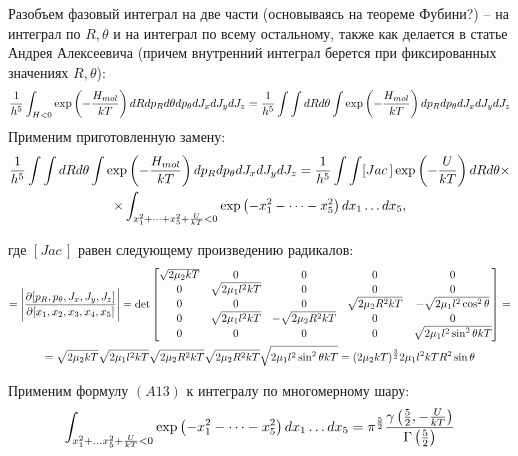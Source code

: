 \documentclass[14pt]{article}
\newcommand{\lb}{\left(}
\newcommand{\rb}{\right)}
\begin{document}
Разобъем фазовый интеграл на две части (основываясь на теореме Фубини?) -- на интеграл по $R, \theta$ и на интеграл по всему остальному, также как делается в статье Андрея Алексеевича (причем внутренний интеграл берется при фиксированных значениях $R, \theta$):
\begin{gather}
	\frac{1}{h^5} \int_{H < 0} \exp \lb -\frac{H_{mol}}{kT} \rb dR dp_R d\theta dp_\theta dJ_x dJ_y dJ_z = \frac{1}{h^5} \int \int dR d\theta \int \exp \lb -\frac{H_{mol}}{kT} \rb dp_R dp_\theta dJ_x dJ_y dJ_z \notag	
\end{gather}
Применим приготовленную замену:
\begin{gather}
	\frac{1}{h^5} \int \int dR d\theta \int \exp \lb -\frac{H_{mol}}{kT} \rb dp_R dp_\theta dJ_x dJ_y dJ_z = \frac{1}{h^5} \int \int [Jac \, ] \exp \lb -\frac{U}{kT} \rb dR d\theta \times \notag \\ \times \int_{x_1^2 + \dots + x_5^2 + \frac{U}{kT} < 0} \exp \lb - x_1^2 - \dots - x_5^2 \rb dx_1 \dots dx_5, \notag 
\end{gather}

где $[Jac \,]$ равен следующему произведению радикалов: 
\begin{gather}
	[Jac\,] = \Bigg{|} \frac{\partial [p_R, p_\theta, J_x, J_y, J_z]}{\partial [x_1, x_2, x_3, x_4, x_5]} \Bigg{|} = \det  
	\begin{bmatrix}
		\sqrt{2 \mu_2 k T} & 0 & 0 & 0 & 0 \\
		0 & \sqrt{2 \mu_1 l^2 k T} & 0 & 0 & 0 \\
		0 & 0 & 0 & \sqrt{2 \mu_2 R^2 k T} & -\sqrt{2 \mu_1 l^2 \cos^2 \theta} \\
		0 & \sqrt{2 \mu_1 l^2 k T} & -\sqrt{2 \mu_2 R^2 k T} & 0 & 0 \\
		0 & 0 & 0 & 0 & \sqrt{2 \mu_1 l^2 \sin^2 \theta k T}
	\end{bmatrix} = \notag \\
	= \sqrt{2 \mu_2 k T} \sqrt{2 \mu_1 l^2 k T} \sqrt{2 \mu_2 R^2 kT} \sqrt{2 \mu_2 R^2 kT} \sqrt{2 \mu_1 l^2 \sin^2 \theta kT} = (2 \mu_2 kT)^\frac{3}{2} 2\mu_1 l^2 k T R^2 \sin \theta \notag
\end{gather}

Применим формулу $(A13)$ к интегралу по многомерному шару:
\begin{gather}
	\int_{x_1^2 + \dots x_5^2 + \frac{U}{kT} < 0} \exp \lb -x_1^2 - \dots -x_5^2 \rb dx_1 \dots dx_5 = \pi^\frac{5}{2} \frac{\gamma \lb \frac{5}{2}, - \frac{U}{kT} \rb}{\Gamma \lb \frac{5}{2} \rb} \notag
\end{gather}
\end{document}
